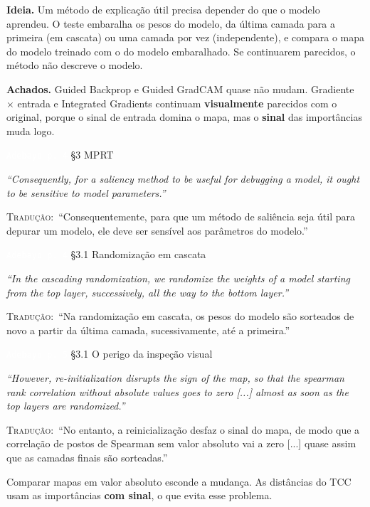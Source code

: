 \documentclass[11pt,a4paper]{article}
\newcommand{\pagechip}[1]{{\setlength{\fboxsep}{1.5pt}\colorbox{cAcc}{\textcolor{white}{\scriptsize\texttt{#1}}}}}
\newenvironment{origquote}{\par\itshape\small}{\par}
\newenvironment{tradquote}{\par\small\textsc{Tradução:}\ }{\par}
\newcommand{\explab}[1]{\par\smallskip{\small\color{cAcc}\textbf{\MakeUppercase{#1}}}\par}
\begin{document}
\textbf{Ideia.} Um método de explicação útil precisa depender do que o modelo aprendeu. O teste embaralha os pesos do modelo, da última camada para a primeira (em cascata) ou uma camada por vez (independente), e compara o mapa do modelo treinado com o do modelo embaralhado. Se continuarem parecidos, o método não descreve o modelo.

\textbf{Achados.} Guided Backprop e Guided GradCAM quase não mudam. Gradiente $\times$ entrada e Integrated Gradients continuam \textbf{visualmente} parecidos com o original, porque o sinal de entrada domina o mapa, mas o \textbf{sinal} das importâncias muda logo.

\begin{citacard}{\pagechip{Adebayo p. 4} §3 MPRT}
\begin{origquote}“Consequently, for a saliency method to be useful for debugging a model, it ought to be sensitive to model parameters.”\end{origquote}
\begin{tradquote}“Consequentemente, para que um método de saliência seja útil para depurar um modelo, ele deve ser sensível aos parâmetros do modelo.”\end{tradquote}
\end{citacard}

\begin{citacard}{\pagechip{Adebayo p. 4} §3.1 Randomização em cascata}
\begin{origquote}“In the cascading randomization, we randomize the weights of a model starting from the top layer, successively, all the way to the bottom layer.”\end{origquote}
\begin{tradquote}“Na randomização em cascata, os pesos do modelo são sorteados de novo a partir da última camada, sucessivamente, até a primeira.”\end{tradquote}
\end{citacard}

\begin{citacard}{\pagechip{Adebayo p. 5} §3.1 O perigo da inspeção visual}
\begin{origquote}“However, re-initialization disrupts the sign of the map, so that the spearman rank correlation without absolute values goes to zero [...] almost as soon as the top layers are randomized.”\end{origquote}
\begin{tradquote}“No entanto, a reinicialização desfaz o sinal do mapa, de modo que a correlação de postos de Spearman sem valor absoluto vai a zero [...] quase assim que as camadas finais são sorteadas.”\end{tradquote}
\explab{Explicação}
Comparar mapas em valor absoluto esconde a mudança. As distâncias do TCC usam as importâncias \textbf{com sinal}, o que evita esse problema.
\end{citacard}
\end{document}
